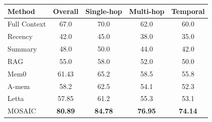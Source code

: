 \begin{tabular}{@{}lcccc@{}}
\toprule
\textbf{Method} & \textbf{Overall} & \textbf{Single-hop}
  & \textbf{Multi-hop} & \textbf{Temporal} \\
\midrule
Full Context & 67.0 & 70.0 & 62.0 & 60.0 \\
Recency & 42.0 & 45.0 & 38.0 & 35.0 \\
Summary & 48.0 & 50.0 & 44.0 & 42.0 \\
RAG & 55.0 & 58.0 & 52.0 & 50.0 \\
Mem0 & 61.43 & 65.2 & 58.5 & 55.8 \\
A-mem & 58.2 & 62.5 & 54.1 & 52.3 \\
Letta & 57.85 & 61.2 & 55.3 & 53.1 \\
MOSAIC & \textbf{80.89} & \textbf{84.78} & \textbf{76.95} & \textbf{74.14} \\
\bottomrule
\end{tabular}